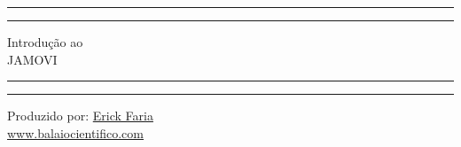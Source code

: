 \begin{titlepage}
	\centering %
	\scshape %
	\vspace*{1.5\baselineskip} %

	\rule{13cm}{1.6pt}\vspace*{-\baselineskip}\vspace*{2pt} %
	\rule{13cm}{0.4pt} %
	
		\vspace{0.75\baselineskip} %
	{	\Huge Introdução ao\\ 
			\vspace{4mm}
		JAMOVI \\	}
		\vspace{0.75\baselineskip} %
	\rule{13cm}{0.4pt}\vspace*{-\baselineskip}\vspace{3.2pt} %
	\rule{13cm}{1.6pt} %
	
		\vspace{1.75\baselineskip} %
	{\large Produzido por: \href{https://www.balaiocientifico.com/author/erickfaria/}{Erick Faria} \\
		\vspace*{1.2\baselineskip}}
	\vfill
\url{www.balaiocientifico.com}\\
\vspace{0.5cm}
\ccby
\end{titlepage}